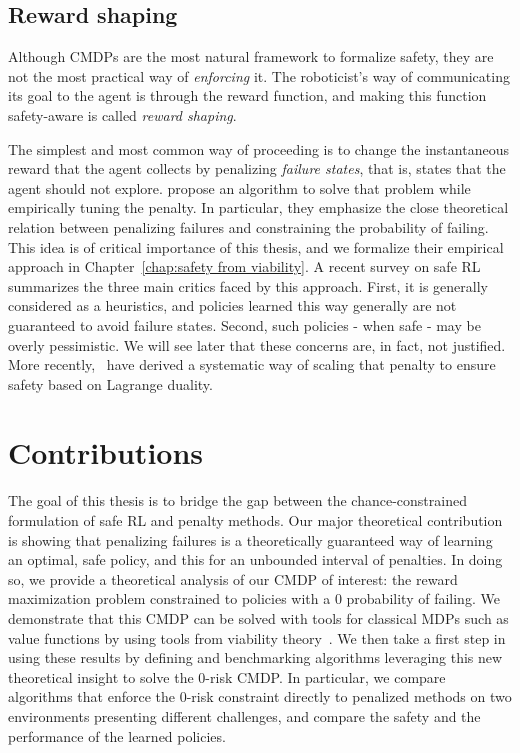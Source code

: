 	\subsection{Reward shaping} 
	Although CMDPs are the most natural framework to formalize safety, they are not the most practical way of\emph{ enforcing} it. The roboticist's way of communicating its goal to the agent is through the reward function, and making this function safety-aware is called\emph{ reward shaping}.\par
	The simplest and most common way of proceeding is to change the instantaneous reward that the agent collects by penalizing\emph{ failure states}, that is, states that the agent should not explore. \textcite{geibel2005risk} propose an algorithm to solve that problem while empirically tuning the penalty. In particular, they emphasize the close theoretical relation between penalizing failures and constraining the probability of failing. This idea is of critical importance of this thesis, and we formalize their empirical approach in Chapter~\ref{chap:safety from viability}. A recent survey on safe RL~\cite{garcia2015comprehensive} summarizes the three main critics faced by this approach. First, it is generally considered as a heuristics, and policies learned this way generally are not guaranteed to avoid failure states. Second, such policies - when safe - may be overly pessimistic. We will see later that these concerns are, in fact, not justified. More recently,~\textcite{paternain2019safe} have derived a systematic way of scaling that penalty to ensure safety based on Lagrange duality.
\section{Contributions}
	The goal of this thesis is to bridge the gap between the chance-constrained formulation of safe RL and penalty methods. Our major theoretical contribution is showing that penalizing failures is a theoretically guaranteed way of learning an optimal, safe policy, and this for an unbounded interval of penalties. In doing so, we provide a theoretical analysis of our CMDP of interest: the reward maximization problem constrained to policies with a $0$ probability of failing. We demonstrate that this CMDP can be solved with tools for classical MDPs such as value functions by using tools from viability theory~\cite{aubin2011viability}. We then take a first step in using these results by defining and benchmarking algorithms leveraging this new theoretical insight to solve the $0$-risk CMDP. In particular, we compare algorithms that enforce the $0$-risk constraint directly to penalized methods on two environments presenting different challenges, and compare the safety and the performance of the learned policies.
